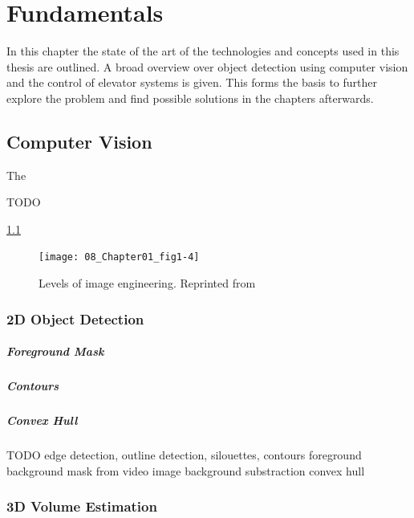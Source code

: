 \chapter{Fundamentals}
\label{chap:sota}
In this chapter the state of the art of the technologies and concepts used in this thesis are outlined.
A broad overview over object detection using computer vision and the control of elevator systems is given.
This forms the basis to further explore the problem and find possible solutions in the chapters afterwards.

\section{Computer Vision}

The 

TODO

\ref{fig:sota:imageengineering}
\begin{figure}[hbt]
	\centering
	\texttt{[image: 08\_Chapter01\_fig1-4]}
	\caption{\label{fig:sota:imageengineering} Levels of image engineering. 
	Reprinted from \textcite[][Chapter~1]{zhang2017imageprocessing}}
\end{figure}

\subsection{2D Object Detection}

\paragraph{Foreground Mask}

\paragraph{Contours}

\paragraph{Convex Hull}

TODO
edge detection, outline detection, silouettes, contours
foreground background mask from video image
background substraction
convex hull


\subsection{3D Volume Estimation}

